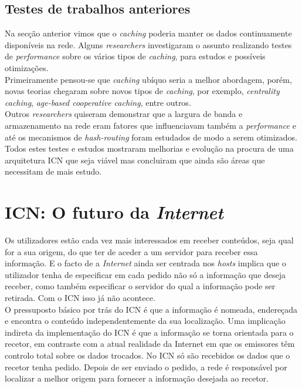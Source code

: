 \documentclass[conference]{IEEEtran}
\begin{document}
\subsection{Testes de trabalhos anteriores}

Na sec\c{c}\~{a}o anterior vimos que o \textit{caching} poderia manter os dados continuamente dispon\'{i}veis na rede. Alguns \textit{researchers} investigaram o assunto\cite{cachingicn} realizando testes de \textit{performance} sobre os v\'{a}rios tipos de \textit{caching}, para estudos e possíveis otimizações\cite{probcaching}.\\


Primeiramente pensou-se que \textit{caching} ub\'{i}quo seria a melhor abordagem, por\'{e}m, novas teorias chegaram sobre novos tipos de \textit{caching}, por exemplo,  \textit{centrality caching}\cite{lessMore}, \textit{age-based cooperative caching}\cite{agebased}, entre outros.\\


Outros \textit{researchers} quiseram demonstrar que a largura de banda e armazenamento na rede eram fatores que influenciavam também a \textit{performance}\cite{modeling}\cite{bandstorage} e até os mecanismos de \textit{hash-routing} foram estudados de modo a serem otimizados\cite{hashrouting}.\\

Todos estes testes e estudos mostraram melhorias e evolução na procura de uma arquitetura ICN que seja viável mas concluiram que ainda são áreas que necessitam de mais estudo.\\


\section{ICN: O futuro da \textit{Internet}}

Os utilizadores est\~{a}o cada vez mais interessados em receber conte\'{u}dos, seja qual for a sua origem, do que ter de aceder a um servidor para receber essa informa\c{c}\~{a}o. E o facto de a \textit{Internet} ainda ser centrada nos \textit{hosts} implica que o utilizador tenha de especificar em cada pedido n\~{a}o s\'{o} a informa\c{c}\~{a}o que deseja receber, como tamb\'{e}m especificar o servidor do qual a informa\c{c}\~{a}o pode ser retirada. Com o ICN isso j\'{a} n\~{a}o acontece\cite{surveyICN}.\\

O pressuposto b\'{a}sico por tr\'{a}s do ICN \'{e} que a informa\c{c}\~{a}o \'{e} nomeada, endere\c{c}ada e encontra o conte\'{u}do independentemente da sua localiza\c{c}\~{a}o. Uma implica\c{c}\~{a}o indireta da implementa\c{c}\~{a}o do ICN \'{e} que a informa\c{c}\~{a}o se torna orientada para o recetor, em contraste com a atual realidade da Internet em que os emissores t\^{e}m controlo total sobre os dados trocados\cite{publishSubscribe}. No ICN s\'{o} s\~{a}o recebidos os dados que o recetor tenha pedido. Depois de ser enviado o pedido, a rede \'{e} respons\'{a}vel por localizar a melhor origem para fornecer a informa\c{c}\~{a}o desejada ao recetor.\\
\end{document}
